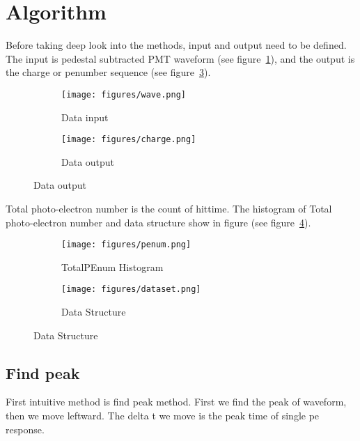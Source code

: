 \section{Algorithm} %

Before taking deep look into the methods, input and output need to be defined. The input is pedestal subtracted PMT waveform (see figure~\ref{fig:input}), and the output is the charge or penumber sequence (see figure~\ref{fig:output}). 

\begin{figure}[H]
\begin{minipage}{.5\textwidth}
\begin{figure}[H]
    \centering
        \texttt{[image: figures/wave.png]}
    \caption{\label{fig:input} Data input}
\end{figure}
\end{minipage}
\begin{minipage}{.5\textwidth}
\begin{figure}[H]
    \centering
        \texttt{[image: figures/charge.png]}
    \caption{\label{fig:output} Data output}
\end{figure}
\end{minipage}
\end{figure}

Total photo-electron number is the count of hittime. The histogram of Total photo-electron number and data structure show in figure (see figure~\ref{fig:penum}). 

\begin{figure}[H]
\begin{minipage}{.5\textwidth}
\begin{figure}[H]
    \centering
        \texttt{[image: figures/penum.png]}
    \caption{\label{fig:penum} TotalPEnum Histogram}
\end{figure}
\end{minipage}
\begin{minipage}{.5\textwidth}
\begin{figure}[H]
    \centering
        \texttt{[image: figures/dataset.png]}
    \caption{\label{fig:set} Data Structure}
\end{figure}
\end{minipage}
\end{figure}

\subsection{Find peak}
First intuitive method is find peak method. First we find the peak of waveform, then we move leftward. The delta t we move is the peak time of single pe response. 

